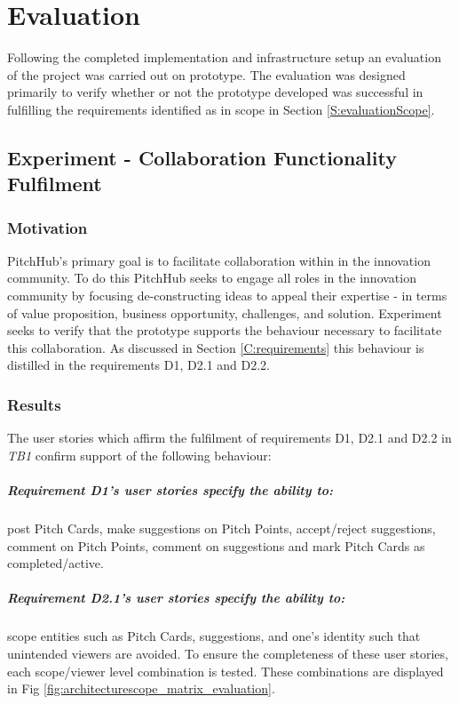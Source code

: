 \chapter{Evaluation}
Following the completed implementation and infrastructure setup an evaluation of the project was carried out on prototype. The evaluation was designed primarily to verify whether or not the prototype developed was successful in fulfilling the requirements identified as in scope in Section \ref{S:evaluationScope}.

\section{Experiment  - Collaboration Functionality Fulfilment}

\subsection{Motivation}
PitchHub's primary goal is to facilitate collaboration within in the innovation community. To do this PitchHub seeks to engage all roles in the innovation community by focusing de-constructing ideas to appeal their expertise - in terms of  value proposition, business opportunity, challenges, and solution. Experiment  seeks to verify that the prototype supports the behaviour necessary to facilitate this collaboration. As discussed in Section \ref{C:requirements} this behaviour is distilled in the requirements D1, D2.1 and D2.2.

\subsection{Results}
The user stories which affirm the fulfilment of requirements D1, D2.1 and D2.2 in \textit{TB1} confirm support of the following behaviour:

\paragraph{Requirement D1's user stories specify the ability to:} post Pitch Cards, make suggestions on Pitch Points, accept/reject suggestions, comment on Pitch Points, comment on suggestions and mark Pitch Cards as completed/active.

\paragraph{Requirement D2.1's user stories specify the ability to:} scope entities such as Pitch Cards, suggestions, and one's identity such that unintended viewers are avoided. To ensure the completeness of these user stories, each scope/viewer level combination is tested. These combinations are displayed in Fig \ref{fig:architecturescope_matrix_evaluation}.

